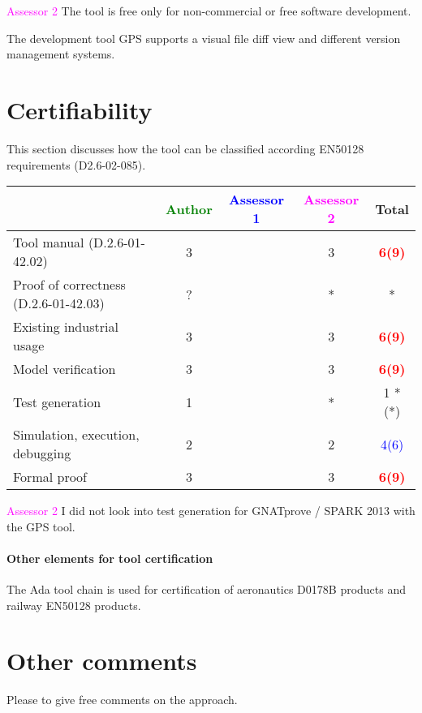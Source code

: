 \textcolor{magenta}{Assessor 2} The tool is free only for non-commercial or free
software development.

The development tool GPS supports a visual file diff view and different version
management systems.

\section{Certifiability}

This section discusses how the tool can be classified according EN50128 requirements (D2.6-02-085).


\begin{tabular}{|l | c | c | c | c|}
\hline
& \textcolor{green}{Author} & \textcolor{blue}{Assessor 1} & \textcolor{magenta}{Assessor 2} & Total \\
\hline 
Tool manual (D.2.6-01-42.02) & 3     & & 3     &  \textcolor{red}{\textbf{6(9)}} \\
\hline
Proof of correctness (D.2.6-01-42.03)   & ? & & * & * \\
\hline
Existing industrial  usage  & 3     &  & 3     & \textcolor{red}{\textbf{6(9)}}  \\
\hline
Model verification & 3     & & 3     &  \textcolor{red}{\textbf{6(9)}} \\
\hline
Test generation & 1     & & * & 1 *(*)\\
\hline
Simulation, execution, debugging & 2     & & 2     & \textcolor{blue}{4(6)}  \\
\hline
Formal proof & 3     & & 3     &  \textcolor{red}{\textbf{6(9)}} \\
\hline
\end{tabular}

\textcolor{magenta}{Assessor 2} I did not look into test generation for
GNATprove / SPARK 2013 with the GPS tool.

\paragraph{Other elements for tool certification}


The Ada tool chain is used for certification of aeronautics D0178B
products and railway EN50128 products.

\section{Other comments}
Please to  give free comments on the approach.



